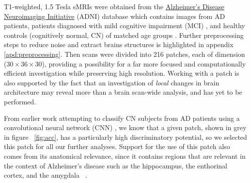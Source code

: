 \documentclass{article}
\begin{document}
T1-weighted, 1.5 Tesla sMRIs were obtained from the \href{adni.loni.usc.edu}{Alzheimer's Disease Neuroimaging Initiative} (ADNI) database which contains images from AD patients, patients diagnosed with mild cognitive impairment (MCI) \citep{gauthier2006mild}, and healthy controls (cognitively normal, CN) of matched age groups \citep{jack2008alzheimer}. Further preprocessing steps to reduce noise and extract brains structures is highlighted in appendix \ref{apd:preprocessing}. Then scans were divided into 216 patches, each of dimension ($30\times36\times30$), providing a possibility for a far more focused and computationally efficient investigation while preserving high resolution. Working with a patch is also supported by the fact that an investigation of \emph{local} changes in brain architecture may reveal more than a brain scan-wide analysis, and has yet to be performed.

From earlier work attempting to classify CN subjects from AD patients using a convolutional neural network (CNN) \citep{bruningk2020image}, we know that a given patch, shown in grey in figure ~\ref{fig:acc}, has a particularly high discriminatory potential, so we selected this patch for all our further analyses. Support for the use of this patch also comes from its anatomical relevance, since it contains regions that are relevant in the context of Alzheimer's disease such as the hippocampus, the enthorinal cortex, and the amygdala ~\citep{goedert2006century}.
\end{document}
